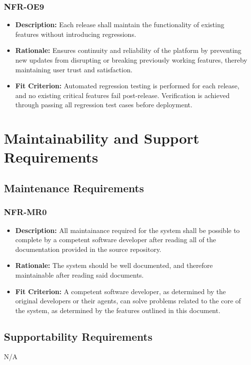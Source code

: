 \documentclass[12pt]{article}
\begin{document}
\subsubsection*{NFR-OE9}
\begin{itemize}
  \item \textbf{Description:} Each release shall maintain the functionality of existing features without introducing regressions.
  \item \textbf{Rationale:} Ensures continuity and reliability of the platform by preventing new updates from disrupting or breaking previously working features, thereby maintaining user trust and satisfaction.
  \item \textbf{Fit Criterion:} Automated regression testing is performed for each release, and no existing critical features fail post-release. Verification is achieved through passing all regression test cases before deployment.
\end{itemize}


\section{Maintainability and Support Requirements}
\subsection{Maintenance Requirements}
\subsubsection*{NFR-MR0}
\begin{itemize}
  \item \textbf{Description:} All maintainance required for the system shall be possible to complete by a competent software developer after reading all of the documentation provided in the source repository.
  \item \textbf{Rationale:} The system should be well documented, and therefore maintainable after reading said documents.
  \item \textbf{Fit Criterion:} A competent software developer, as determined by the original developers or their agents, can solve problems related to the core of the system, as determined by the 
  features outlined in this document.
\end{itemize}
\subsection{Supportability Requirements}
N/A
\end{document}
